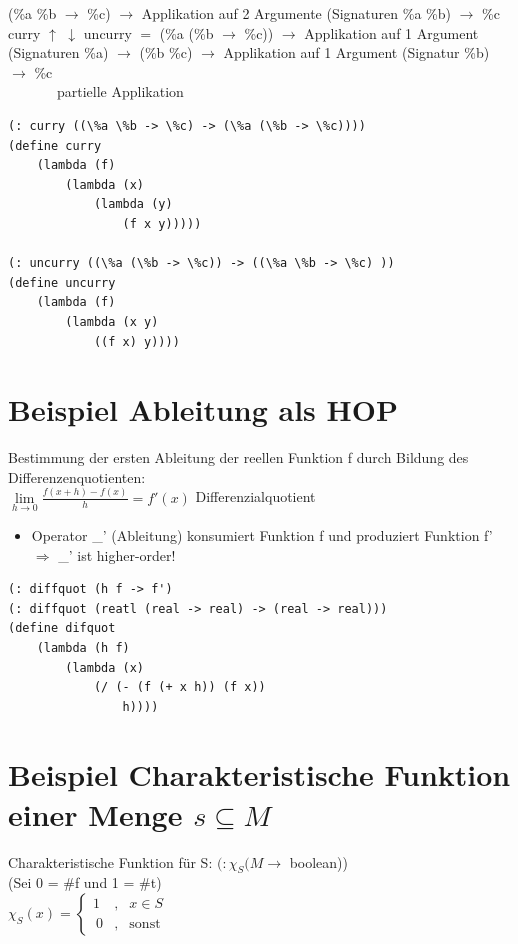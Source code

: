 \documentclass[a4paper, 20pt, openany]{book}
\begin{document}
(\%a \%b $\rightarrow$ \%c) 		$\rightarrow$	Applikation auf 2 Argumente (Signaturen \%a \%b) $\rightarrow$ \%c\\
curry $\uparrow$ $\downarrow$ uncurry										$=$
(\%a (\%b $\rightarrow$ \%c)) 		$\rightarrow$	Applikation auf 1 Argument (Signaturen \%a) $\rightarrow$ (\%b \%c) $\rightarrow$ Applikation auf 1 Argument (Signatur \%b) $\rightarrow$ \%c \\
\ \ \ \ \ \ \ partielle Applikation

\begin{lstlisting}
(: curry ((\%a \%b -> \%c) -> (\%a (\%b -> \%c))))
(define curry
	(lambda (f)
		(lambda (x)
			(lambda (y)
				(f x y)))))

(: uncurry ((\%a (\%b -> \%c)) -> ((\%a \%b -> \%c) ))
(define uncurry
	(lambda (f)
		(lambda (x y)
			((f x) y))))
\end{lstlisting}

\section{Beispiel Ableitung als HOP}
Bestimmung der ersten Ableitung der reellen Funktion f durch Bildung des Differenzenquotienten:\\
$\lim \limits_{h \rightarrow 0} \frac{f(x+h) - f(x)}{h} = f'(x)$ Differenzialquotient\\
\begin{itemize}
\item Operator \_' (Ableitung) konsumiert Funktion f und produziert Funktion f' $\Rightarrow$ \_' ist higher-order!
\end{itemize}

\begin{lstlisting}
(: diffquot (h f -> f')
(: diffquot (reatl (real -> real) -> (real -> real)))
(define difquot
	(lambda (h f)
		(lambda (x)
			(/ (- (f (+ x h)) (f x))
				h))))
\end{lstlisting}

\section{Beispiel Charakteristische Funktion einer Menge $s \subseteq M$}
Charakteristische Funktion für S: $(: \chi_S (M \rightarrow$ boolean))\\
(Sei 0 = \#f und 1 = \#t)\\
$\chi_{S}(x) =\left\{\begin{array}{rcl}1 &,& x\in S\\\ 0  &,& \mathrm{sonst}\end{array}\right.$
\end{document}
